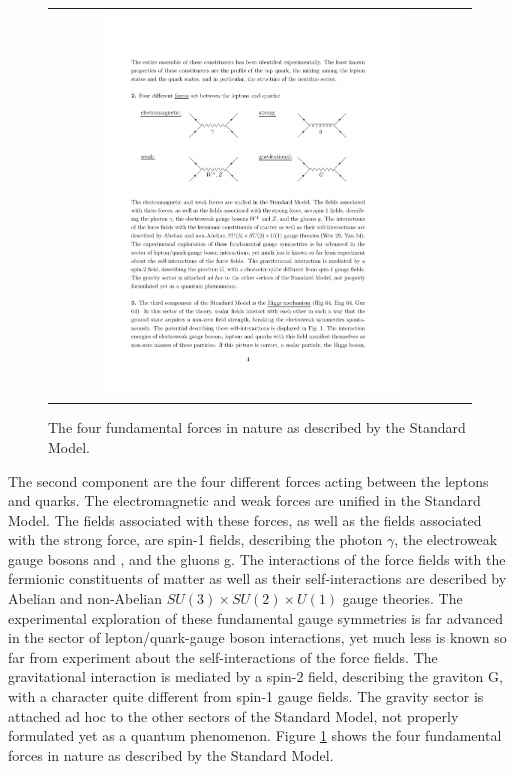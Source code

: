 	\begin{figure}[tbh!]
		\centering
		\begin{tabular}{cc}
			\includegraphics[width=0.75\textwidth]{theory/pics/SM_forces.pdf}
		\end{tabular}
		\caption{The four fundamental forces in nature as described by the Standard Model.}
		\label{fig:SM_forces}
	\end{figure}
	
The second component are the four different forces acting between the leptons and quarks. The electromagnetic and weak forces are unified in the Standard Model. The fields associated with these forces, as well as the fields associated with the strong force, are spin-1 fields, describing the photon \ensuremath{\gamma}, the electroweak gauge bosons \W and \Z, and the gluons g. The interactions of the force fields with the fermionic constituents of matter as well as their self-interactions are described by Abelian and non-Abelian \ensuremath{SU(3) \times SU(2) \times U(1)} gauge theories. The experimental exploration of these fundamental gauge symmetries is far advanced in the sector of lepton/quark-gauge boson interactions, yet much less is known so far from experiment about the self-interactions of the force fields. The gravitational interaction is mediated by a spin-2 field, describing the graviton G, with a character quite different from spin-1 gauge fields. The gravity sector is attached ad hoc to the other sectors of the Standard Model, not properly formulated yet as a quantum phenomenon. Figure \ref{fig:SM_forces} shows the four fundamental forces in nature as described by the Standard Model.

